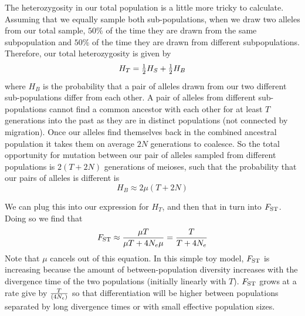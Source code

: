The heterozygosity in our total population is a little more tricky to
calculate. Assuming that we equally sample both sub-populations, when we draw two alleles from our total
sample, $50\%$ of the time they are drawn from the same
subpopulation and $50\%$ of the time they are drawn from different
subpopulations. Therefore, our total heterozygosity is given by
\begin{equation}
H_T = \half H_S + \half H_B
\end{equation}
where $H_B$ is the probability that a pair of alleles drawn from our
two different sub-populations differ from each other. A pair of
alleles from different sub-populations cannot find a common ancestor with each other for at least $T$
generations into the past as they are in distinct populations (not
connected by migration). Once our alleles find themselves back in the combined ancestral 
population it takes them on average $2N$ generations to coalesce. So the total opportunity for mutation between our pair of alleles sampled from different populations is $2 (T + 2N )$ generations of meioses, such that the probability that our pairs of alleles is different is 
\begin{equation}
H_B \approx 2\mu ( T + 2 N) %
\end{equation}


We can plug this into our expression for $H_T$, and then that in turn
into $\fst$. Doing so we find that
\begin{equation}
\fst \approx \frac{ \mu T}{\mu T +  4N_e\mu }  = \frac{ T}{ T +  4N_e }
\end{equation}
Note that $\mu$ cancels out of this equation. In this simple toy model, $\fst$
is increasing because the amount of between-population diversity 
increases with the divergence time of the two populations (initially
linearly with $T$). $\fst$ grows at a rate
give by $\nicefrac{T}{(4N_e)}$ so that differentiation will be higher
between populations separated by long divergence times or with small
effective population sizes.

